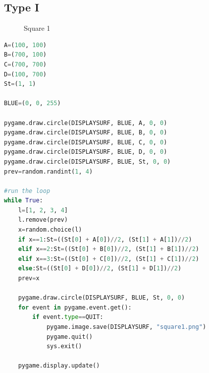 \documentclass{article}
\begin{document}
\subsection{Type I}
\begin{figure}[H]
\centering 
\noindent{}%
\caption{Square 1}
\end{figure}
\begin{lstlisting}[language=Python, frame=single]
A=(100, 100)
B=(700, 100)
C=(700, 700)
D=(100, 700)
St=(1, 1)

BLUE=(0, 0, 255)

pygame.draw.circle(DISPLAYSURF, BLUE, A, 0, 0)
pygame.draw.circle(DISPLAYSURF, BLUE, B, 0, 0)
pygame.draw.circle(DISPLAYSURF, BLUE, C, 0, 0)
pygame.draw.circle(DISPLAYSURF, BLUE, D, 0, 0)
pygame.draw.circle(DISPLAYSURF, BLUE, St, 0, 0)
prev=random.randint(1, 4)

#run the loop
while True:
    l=[1, 2, 3, 4]
    l.remove(prev)
    x=random.choice(l)
    if x==1:St=((St[0] + A[0])//2, (St[1] + A[1])//2)
    elif x==2:St=((St[0] + B[0])//2, (St[1] + B[1])//2)
    elif x==3:St=((St[0] + C[0])//2, (St[1] + C[1])//2)
    else:St=((St[0] + D[0])//2, (St[1] + D[1])//2)
    prev=x
    
    pygame.draw.circle(DISPLAYSURF, BLUE, St, 0, 0)
    for event in pygame.event.get():
        if event.type==QUIT:
            pygame.image.save(DISPLAYSURF, "square1.png")
            pygame.quit()
            sys.exit()
            
    pygame.display.update()
\end{lstlisting}
\end{document}
